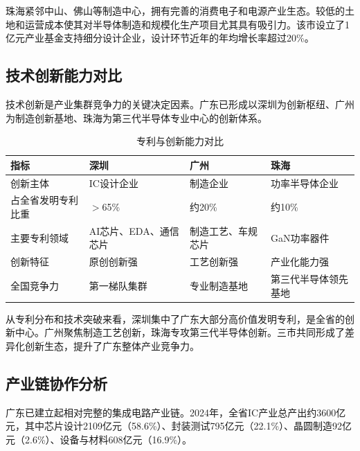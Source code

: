 \documentclass[12pt,a4paper]{article}
\newcommand{\tableHeaderRow}{\rowcolor{tealPrimary}\color{white}}
\newcommand{\tableOddRow}{\rowcolor{mintBG}}
\newcommand{\tableEvenRow}{\rowcolor{white}}
\begin{document}
珠海紧邻中山、佛山等制造中心，拥有完善的消费电子和电源产业生态。较低的土地和运营成本使其对半导体制造和规模化生产项目尤其具有吸引力。该市设立了1亿元产业基金支持细分设计企业，设计环节近年的年均增长率超过20\%。

\subsection{技术创新能力对比}
\label{sec:innovation_compare}

技术创新是产业集群竞争力的关键决定因素。广东已形成以深圳为创新枢纽、广州为制造创新基地、珠海为第三代半导体专业中心的创新体系。

\begin{table}[H]
\centering
\caption{专利与创新能力对比}
\label{tab:innovation_compare}
\begin{tabular}{p{2.5cm}p{3.5cm}p{3.5cm}p{3.5cm}}
\toprule
\tableHeaderRow
\textbf{指标} & \textbf{深圳} & \textbf{广州} & \textbf{珠海} \\
\midrule
\tableOddRow 创新主体 & IC设计企业 & 制造企业 & 功率半导体企业 \\
\tableEvenRow 占全省发明专利比重 & $>$65\% & 约20\% & 约10\% \\
\tableOddRow 主要专利领域 & AI芯片、EDA、通信芯片 & 制造工艺、车规芯片 & GaN功率器件 \\
\tableEvenRow 创新特征 & 原创创新强 & 工艺创新强 & 产业化能力强 \\
\tableOddRow 全国竞争力 & 第一梯队集群 & 专业制造基地 & 第三代半导体领先基地 \\
\bottomrule
\end{tabular}
\end{table}

从专利分布和技术突破来看，深圳集中了广东大部分高价值发明专利，是全省的创新中心。广州聚焦制造工艺创新，珠海专攻第三代半导体创新。三市共同形成了差异化创新生态，提升了广东整体产业竞争力。

\subsection{产业链协作分析}
\label{sec:chain_collaboration}

广东已建立起相对完整的集成电路产业链。2024年，全省IC产业总产出约3600亿元，其中芯片设计2109亿元（58.6\%）、封装测试795亿元（22.1\%）、晶圆制造92亿元（2.6\%）、设备与材料608亿元（16.9\%）。
\end{document}
